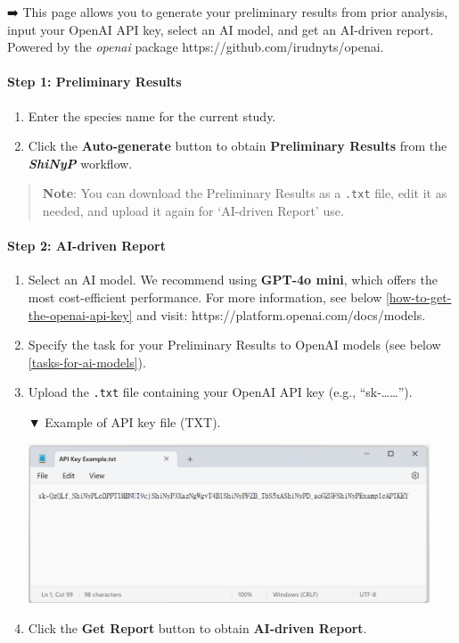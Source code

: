 \documentclass[
]{book}
\begin{document}
➡️ This page allows you to generate your preliminary results from prior analysis, input your OpenAI API key, select an AI model, and get an AI-driven report. Powered by the \emph{openai} package https://github.com/irudnyts/openai.

\paragraph*{Step 1: Preliminary Results}\label{step-1-preliminary-results}

\begin{enumerate}
\def\labelenumi{\arabic{enumi}.}
\item
  Enter the species name for the current study.
\item
  Click the {\textbf{Auto-generate}} button to obtain \textbf{Preliminary Results} from the {\textbf{\emph{ShiNyP}}} workflow.
\end{enumerate}

\begin{quote}
\textbf{Note}: You can download the Preliminary Results as a \texttt{.txt} file, edit it as needed, and upload it again for `AI-driven Report' use.
\end{quote}

\paragraph*{Step 2: AI-driven Report}\label{step-2-ai-driven-report}

\begin{enumerate}
\def\labelenumi{\arabic{enumi}.}
\item
  Select an AI model. We recommend using \textbf{GPT-4o mini}, which offers the most cost-efficient performance. For more information, see below \ref{how-to-get-the-openai-api-key} and visit: https://platform.openai.com/docs/models.
\item
  Specify the task for your Preliminary Results to OpenAI models (see below \ref{tasks-for-ai-models}).
\item
  Upload the \texttt{.txt} file containing your OpenAI API key (e.g., ``sk-\ldots\ldots{}'').

  ▼ Example of API key file (TXT).

  \includegraphics[width=4.6875in,height=\textheight]{images/clipboard-3104956900.png}
\item
  Click the {\textbf{Get Report}} button to obtain \textbf{AI-driven Report}.
\end{enumerate}
\end{document}
